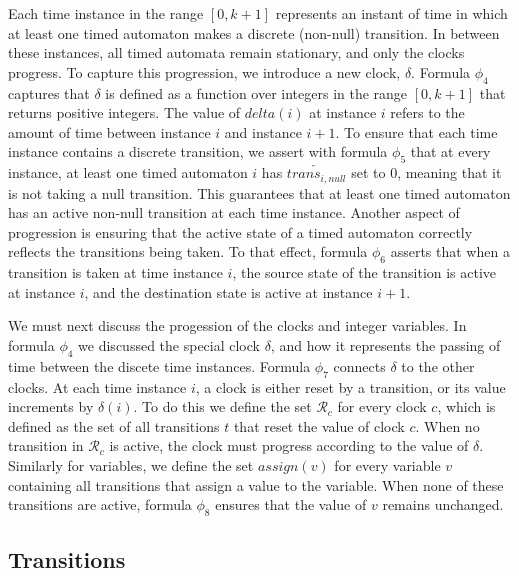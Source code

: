 \documentclass[a4paper,11pt]{article}
\begin{document}
Each time instance in the range \([0,k+1]\) represents an instant of time in
which at least one timed automaton makes a discrete (non-null) transition. In
between these instances, all timed automata remain stationary, and only the
clocks progress. To capture this progression, we introduce a new clock,
\(\delta\). Formula \(\phi_4\) captures that \(\delta\) is defined as a function
over integers in the range \([0,k+1]\) that returns positive integers. The value
of \(delta(i)\) at instance \(i\) refers to the amount of time between instance
\(i\) and instance \(i+1\). To ensure that each time instance contains a
discrete transition, we assert with formula \(\phi_5\) that at every instance,
at least one timed automaton \(i\) has \(\overleftarrow{trans_{i,null}}\) set to
0, meaning that it is not taking a null transition. This guarantees that at
least one timed automaton has an active non-null transition at each time
instance. Another aspect of progression is ensuring that the active state of a
timed automaton correctly reflects the transitions being taken. To that effect,
formula \(\phi_6\) asserts that when a transition is taken at time instance
\(i\), the source state of the transition is active at instance \(i\), and the
destination state is active at instance \(i+1\).

We must next discuss the progession of the clocks and integer variables. In
formula \(\phi_4\) we discussed the special clock \(\delta\), and how it
represents the passing of time between the discete time instances. Formula
\(\phi_7\) connects \(\delta\) to the other clocks. At each time instance \(i\),
a clock is either reset by a transition, or its value increments by
\(\delta(i)\). To do this we define the set \(\mathcal{R}_c\) for every clock
\(c\), which is defined as the set of all transitions \(t\) that reset the value
of clock \(c\). When no transition in \(\mathcal{R}_c\) is active, the clock
must progress according to the value of \(\delta\). Similarly for variables, we
define the set \(assign(v)\) for every variable \(v\) containing all transitions
that assign a value to the variable. When none of these transitions are active,
formula \(\phi_8\) ensures that the value of \(v\) remains unchanged.

\subsection{Transitions}
\label{sec:org05359ad}
\end{document}
